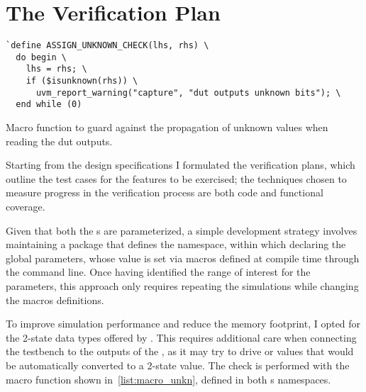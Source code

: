 \section{The Verification Plan}\label{sec:vplan}

\begin{listing}
\begin{verbatim}
`define ASSIGN_UNKNOWN_CHECK(lhs, rhs) \
  do begin \
    lhs = rhs; \
    if ($isunknown(rhs)) \
      uvm_report_warning("capture", "dut outputs unknown bits"); \
  end while (0)
\end{verbatim}
\caption{Macro function to guard against the propagation of unknown values when reading the \acs{dut} outputs.}
\label{list:macro_unkn}
\end{listing}

\noindent Starting from the design specifications I formulated the verification plans, which outline the test cases for the features to be exercised; the techniques chosen to measure progress in the verification process are both code and functional coverage. 

Given that both the {\dut}s are parameterized, a simple development strategy involves maintaining a package that defines the \dut namespace, within which declaring the global parameters, whose value is set via macros defined at compile time through the command line. Once having identified the range of interest for the parameters, this approach only requires repeating the simulations while changing the macros definitions.

To improve simulation performance and reduce the memory footprint, I opted for the 2-state data types offered by \sv. This requires additional care when connecting the testbench to the outputs of the \dut, as it may try to drive  or  values that would be automatically converted to a 2-state value. The check is performed with the macro function shown in~\cref{list:macro_unkn}, defined in both {\dut}s namespaces.

